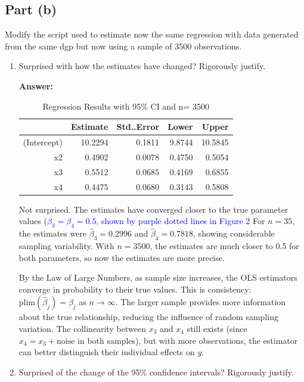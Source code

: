 \documentclass[12pt,a4paper]{article}
\begin{document}
\subsection*{Part (b)}
Modify the script used to estimate now the same regression with data 
generated from the same dgp but now using a sample of 3500 observations.

\begin{enumerate}[label=(\roman*)]
  \item Surprised with how the estimates have changed? Rigorously justify.
  
  \textbf{Answer:} 

  \begin{table}[ht]
\centering
\caption{Regression Results with 95\% CI and n= 3500} 
\label{tab:regression2}
\begin{tabular}{rrrrr}
  \hline
 & Estimate & Std..Error & Lower & Upper \\ 
  \hline
(Intercept) & 10.2294 & 0.1811 & 9.8744 & 10.5845 \\ 
  x2 & 0.4902  & 0.0078  & 0.4750 & 0.5054 \\ 
  x3 &0.5512 &  0.0685 & 0.4169 & 0.6855 \\ 
  x4 & 0.4475 & 0.0680 & 0.3143 & 0.5808 \\ 
   \hline
\end{tabular}
\end{table}
  
  Not surprised. The estimates have converged closer to the true parameter 
  values 
\textcolor{blue}{($\beta_3=\beta_4=0.5$, shown by purple dotted lines in Figure 2} For $n=35$, the estimates were $\hat{\beta}_3=0.2996$ 
  and $\hat{\beta}_4=0.7818$, showing considerable sampling variability. 
  With $n=3500$, the estimates are much closer to 0.5 for both parameters, so now the estimates are more precise.
  
  By the Law of Large Numbers, as sample size increases, the OLS estimators 
  converge in probability to their true values. This is consistency: 
  $\text{plim}(\hat{\beta}_j) = \beta_j$ as $n \to \infty$. The larger 
  sample provides more information about the true relationship, reducing 
  the influence of random sampling variation. The collinearity between $x_3$ 
  and $x_4$ still exists (since $x_4 = x_3 + \text{noise}$ in both samples), 
  but with more observations, the estimator can better distinguish their 
  individual effects on $y$.
  
  
  \item Surprised of the change of the 95\% confidence intervals? Rigorously justify.
  

\end{enumerate}
\end{document}
